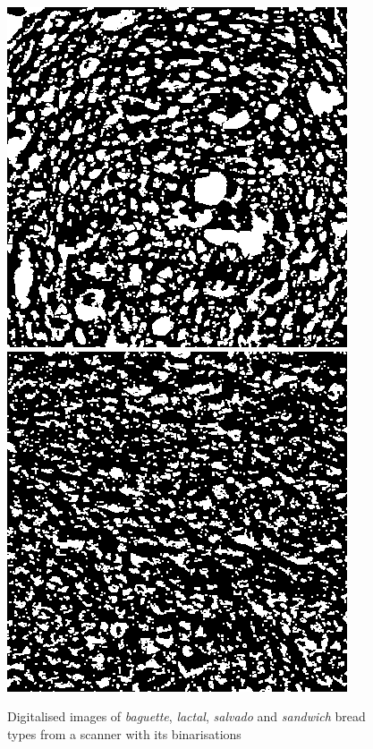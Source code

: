 \documentclass[oneside,a4paper,english,links]{article}
\begin{document}
\begin{figure}[htb]
\includegraphics[scale=0.26]{imagenes/salvado43bin}
\includegraphics[scale=0.26]{imagenes/sandwich43bin}
\caption{Digitalised images of {\em baguette}, {\em lactal}, {\em salvado} and {\em sandwich} bread types from a scanner with its binarisations}
\label{fig:bread}
\end{figure}
\end{document}
